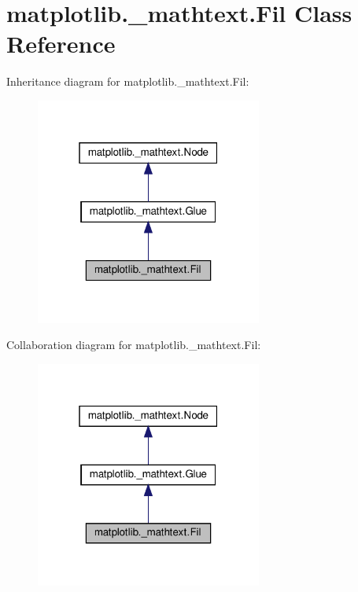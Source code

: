 \hypertarget{classmatplotlib_1_1__mathtext_1_1Fil}{}\section{matplotlib.\+\_\+mathtext.\+Fil Class Reference}
\label{classmatplotlib_1_1__mathtext_1_1Fil}


Inheritance diagram for matplotlib.\+\_\+mathtext.\+Fil\+:
\nopagebreak
\begin{figure}[H]
\begin{center}
\leavevmode
\includegraphics[width=211pt]{classmatplotlib_1_1__mathtext_1_1Fil__inherit__graph}
\end{center}
\end{figure}


Collaboration diagram for matplotlib.\+\_\+mathtext.\+Fil\+:
\nopagebreak
\begin{figure}[H]
\begin{center}
\leavevmode
\includegraphics[width=211pt]{classmatplotlib_1_1__mathtext_1_1Fil__coll__graph}
\end{center}
\end{figure}
